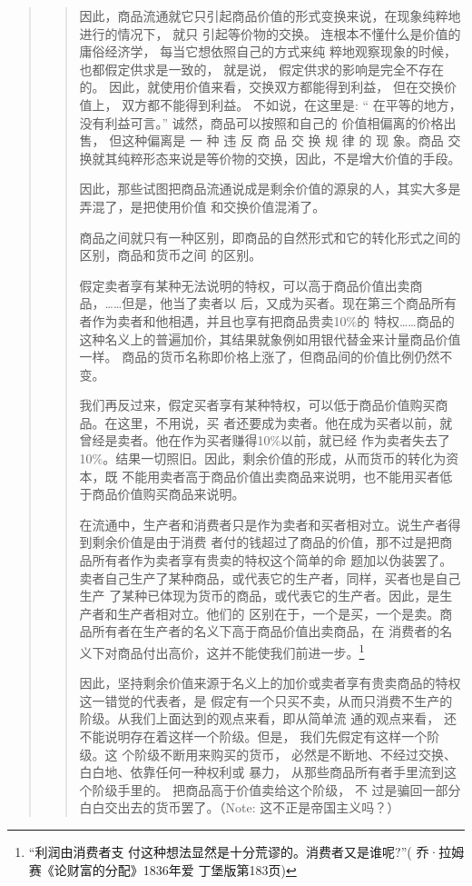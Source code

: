 \begin{quotation}
\begin{quotation}
因此，商品流通就它只引起商品价值的形式变换来说，在现象纯粹地进行的情况下， 就只
引起等价物的交换。 连根本不懂什么是价值的庸俗经济学， 每当它想依照自己的方式来纯
粹地观察现象的时候，也都假定供求是一致的， 就是说， 假定供求的影响是完全不存在的。
因此，就使用价值来看，交换双方都能得到利益， 但在交换价值上， 双方都不能得到利益。
不如说，在这里是: “ 在平等的地方， 没有利益可言。” 诚然，商品可以按照和自己的
价值相偏离的价格出售， 但这种偏离是 一 种 违 反 商 品 交 换 规 律 的 现 象。商品
交换就其纯粹形态来说是等价物的交换，因此，不是增大价值的手段。

因此，那些试图把商品流通说成是剩余价值的源泉的人，其实大多是弄混了，是把使用价值
和交换价值混淆了。

商品之间就只有一种区别，即商品的自然形式和它的转化形式之间的区别，商品和货币之间
的区别。

假定卖者享有某种无法说明的特权，可以高于商品价值出卖商品，……但是，他当了卖者以
后，又成为买者。现在第三个商品所有者作为卖者和他相遇，并且也享有把商品贵卖10\%的
特权……商品的这种名义上的普遍加价，其结果就象例如用银代替金来计量商品价值一样。
商品的货币名称即价格上涨了，但商品间的价值比例仍然不变。

我们再反过来，假定买者享有某种特权，可以低于商品价值购买商品。在这里，不用说，买
者还要成为卖者。他在成为买者以前，就曾经是卖者。他在作为买者赚得10\%以前，就已经
作为卖者失去了10\%。结果一切照旧。因此，剩余价值的形成，从而货币的转化为资本，既
不能用卖者高于商品价值出卖商品来说明，也不能用买者低于商品价值购买商品来说明。

在流通中，生产者和消费者只是作为卖者和买者相对立。说生产者得到剩余价值是由于消费
者付的钱超过了商品的价值，那不过是把商品所有者作为卖者享有贵卖的特权这个简单的命
题加以伪装罢了。卖者自己生产了某种商品，或代表它的生产者，同样，买者也是自己生产
了某种已体现为货币的商品，或代表它的生产者。因此，是生产者和生产者相对立。他们的
区别在于，一个是买，一个是卖。商品所有者在生产者的名义下高于商品价值出卖商品，在
消费者的名义下对商品付出高价，这并不能使我们前进一步。\footnote{“利润由消费者支
付这种想法显然是十分荒谬的。消费者又是谁呢?”( 乔·拉姆赛《论财富的分配》1836年爱
丁堡版第183页)}

因此，坚持剩余价值来源于名义上的加价或卖者享有贵卖商品的特权这一错觉的代表者，是
假定有一个只买不卖，从而只消费不生产的阶级。从我们上面达到的观点来看，即从简单流
通的观点来看， 还不能说明存在着这样一个阶级。但是， 我们先假定有这样一个阶级。这
个阶级不断用来购买的货币， 必然是不断地、不经过交换、白白地、依靠任何一种权利或
暴力， 从那些商品所有者手里流到这个阶级手里的。 把商品高于价值卖给这个阶级， 不
过是骗回一部分白白交出去的货币罢了。（Note: 这不正是帝国主义吗？）



\end{quotation}
\end{quotation}
